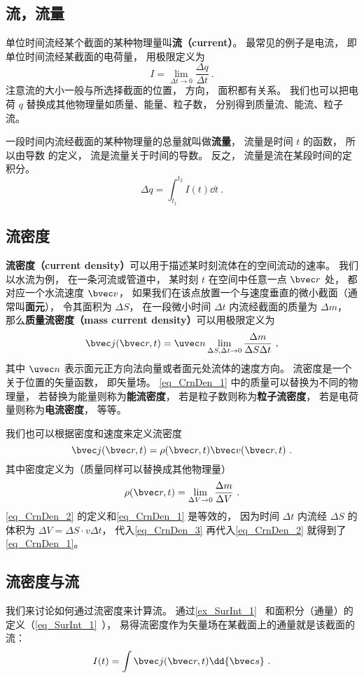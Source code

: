 

\subsection{流，流量}
单位时间流经某个截面的某种物理量叫\textbf{流（current）}。 最常见的例子是电流， 即单位时间流经某截面的电荷量， 用极限定义为
\begin{equation}
I = \lim_{\Delta t \to 0} \frac{\Delta q}{\Delta t}~.
\end{equation}
注意流的大小一般与所选择截面的位置， 方向， 面积都有关系。 我们也可以把电荷 $q$ 替换成其他物理量如质量、能量、粒子数， 分别得到质量流、能流、粒子流。

一段时间内流经截面的某种物理量的总量就叫做\textbf{流量}， 流量是时间 $t$ 的函数， 所以由导数 的定义， 流是流量关于时间的导数。 反之， 流量是流在某段时间的定积分。
\begin{equation}
\Delta q = \int_{t_1}^{t_2} I(t) \dd{t}~.
\end{equation}

\subsection{流密度}
\textbf{流密度（current density）}可以用于描述某时刻流体在的空间流动的速率。 我们以水流为例， 在一条河流或管道中， 某时刻 $t$ 在空间中任意一点 $\bvec r$ 处， 都对应一个水流速度 $\bvec v$， 如果我们在该点放置一个与速度垂直的微小截面（通常叫\textbf{面元}）， 令其面积为 $\Delta S$， 在一段微小时间 $\Delta t$ 内流经截面的质量为 $\Delta m$， 那么\textbf{质量流密度（mass current density）}可以用极限定义为
\begin{equation}\label{eq_CrnDen_1}
\bvec j(\bvec r, t) = \uvec n \lim_{\Delta S, \Delta t \to 0} \frac{\Delta m}{\Delta S \Delta t}~,
\end{equation}
其中 $\uvec n$ 表示面元正方向法向量或者面元处流体的速度方向。 流密度是一个关于位置的矢量函数， 即矢量场。 \autoref{eq_CrnDen_1} 中的质量可以替换为不同的物理量， 若替换为能量则称为\textbf{能流密度}， 若是粒子数则称为\textbf{粒子流密度}， 若是电荷量则称为\textbf{电流密度}， 等等。 

我们也可以根据密度和速度来定义流密度
\begin{equation}\label{eq_CrnDen_2}
\bvec j(\bvec r, t) = \rho(\bvec r, t) \bvec v(\bvec r, t)~.
\end{equation}
其中密度定义为（质量同样可以替换成其他物理量）
\begin{equation}\label{eq_CrnDen_3}
\rho(\bvec r, t) = \lim_{\Delta V\to 0} \frac{\Delta m}{\Delta V}~.
\end{equation}
\autoref{eq_CrnDen_2} 的定义和\autoref{eq_CrnDen_1} 是等效的， 因为时间 $\Delta t$ 内流经 $\Delta S$ 的体积为 $\Delta V = \Delta S \cdot v  \Delta t$， 代入\autoref{eq_CrnDen_3} 再代入\autoref{eq_CrnDen_2} 就得到了\autoref{eq_CrnDen_1}。

\subsection{流密度与流}
我们来讨论如何通过流密度来计算流。 通过\autoref{ex_SurInt_1}~ 和面积分（通量）的定义（\autoref{eq_SurInt_1}~）， 易得流密度作为矢量场在某截面上的通量就是该截面的流：
\begin{equation}
I(t) = \int \bvec j(\bvec r, t) \dd{\bvec s}~.
\end{equation}

